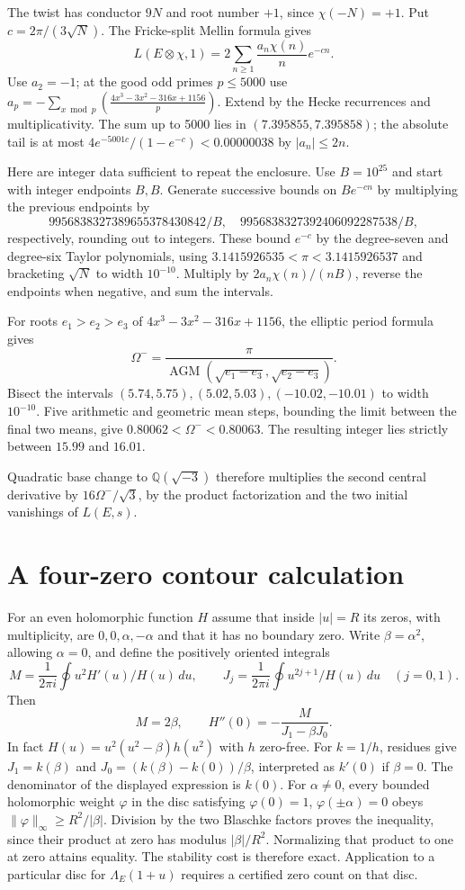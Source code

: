 \documentclass[11pt]{article}
\begin{document}
The twist has conductor \(9N\) and root number \(+1\), since
\(\chi(-N)=+1\). Put \(c=2\pi/(3\sqrt N)\). The Fricke-split Mellin
formula \cite[Ch.~II, Prop.~2.11.2]{Book} gives
\[
 L(E\otimes\chi,1)=2\sum_{n\ge1}\frac{a_n\chi(n)}n e^{-cn}.
\]
Use \(a_2=-1\); at the good odd primes \(p\le5000\) use
\(a_p=-\sum_{x\bmod p}(\frac{4x^3-3x^2-316x+1156}{p})\).
Extend by the Hecke recurrences and multiplicativity. The sum up to 5000
lies in \((7.395855,7.395858)\); the absolute tail is at most
\(4e^{-5001c}/(1-e^{-c})<0.00000038\) by \(|a_n|\le2n\).

Here are integer data sufficient to repeat the enclosure. Use
\(B=10^{25}\) and start with integer endpoints \(B,B\). Generate
successive bounds on \(Be^{-cn}\) by multiplying the previous endpoints by
\[
9956838327389655378430842/B,\quad
9956838327392406092287538/B,
\]
respectively, rounding out to integers. These bound \(e^{-c}\) by
the degree-seven and degree-six Taylor polynomials, using
\(3.1415926535<\pi<3.1415926537\) and bracketing \(\sqrt N\) to
width \(10^{-10}\). Multiply by \(2a_n\chi(n)/(nB)\), reverse the
endpoints when negative, and sum the intervals.

For roots \(e_1>e_2>e_3\) of \(4x^3-3x^2-316x+1156\), the
elliptic period formula gives
\[
 \Omega^-=\frac{\pi}
 {\operatorname{AGM}(\sqrt{e_1-e_3},\sqrt{e_2-e_3})}.
\]
Bisect the intervals \((5.74,5.75),(5.02,5.03),(-10.02,-10.01)\)
to width \(10^{-10}\). Five arithmetic and geometric mean steps,
bounding the limit between the final two means, give
\(0.80062<\Omega^-<0.80063\).
The resulting integer lies strictly between \(15.99\) and \(16.01\).

Quadratic base change to \(\mathbb Q(\sqrt{-3})\) therefore multiplies
the second central derivative by \(16\Omega^-/\sqrt3\), by the product
factorization and the two initial vanishings of \(L(E,s)\).

\section{A four-zero contour calculation}
For an even holomorphic function \(H\) assume that inside
\(|u|=R\) its zeros, with multiplicity, are \(0,0,\alpha,-\alpha\)
and that it has no boundary zero. Write \(\beta=\alpha^2\), allowing
\(\alpha=0\), and define the positively oriented integrals
\[
 M=\frac1{2\pi i}\oint u^2H'(u)/H(u)\,du,\qquad
 J_j=\frac1{2\pi i}\oint u^{2j+1}/H(u)\,du\quad(j=0,1).
\]
Then
\[
 M=2\beta,\qquad H''(0)=-\frac{M}{J_1-\beta J_0}.
\]
In fact \(H(u)=u^2(u^2-\beta)h(u^2)\) with \(h\) zero-free.
For \(k=1/h\), residues give \(J_1=k(\beta)\) and
\(J_0=(k(\beta)-k(0))/\beta\), interpreted as \(k'(0)\) if
\(\beta=0\). The denominator of the displayed expression is \(k(0)\).
For \(\alpha\ne0\), every bounded holomorphic weight \(\varphi\)
in the disc satisfying \(\varphi(0)=1\), \(\varphi(\pm\alpha)=0\)
obeys \(\|\varphi\|_\infty\ge R^2/|\beta|\).
Division by the two Blaschke factors proves the inequality, since their
product at zero has modulus \(|\beta|/R^2\). Normalizing that
product to one at zero attains equality. The stability cost is
therefore exact. Application to a particular disc for
\(\Lambda_E(1+u)\) requires a certified zero count on that disc.
\end{document}
